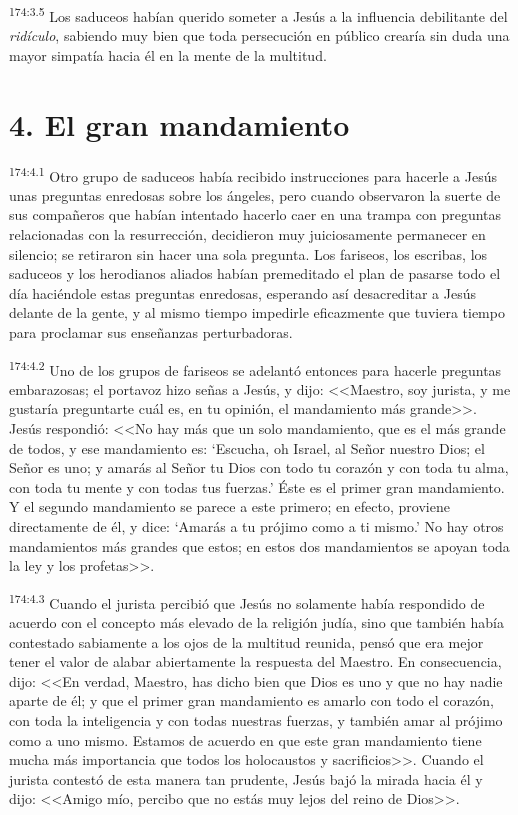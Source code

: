 \par 
\textsuperscript{174:3.5} Los saduceos habían querido someter a Jesús a la influencia debilitante del \textit{ridículo}, sabiendo muy bien que toda persecución en público crearía sin duda una mayor simpatía hacia él en la mente de la multitud.

\section*{4. El gran mandamiento}
\par 
\textsuperscript{174:4.1} Otro grupo de saduceos había recibido instrucciones para hacerle a Jesús unas preguntas enredosas sobre los ángeles, pero cuando observaron la suerte de sus compañeros que habían intentado hacerlo caer en una trampa con preguntas relacionadas con la resurrección, decidieron muy juiciosamente permanecer en silencio; se retiraron sin hacer una sola pregunta. Los fariseos, los escribas, los saduceos y los herodianos aliados habían premeditado el plan de pasarse todo el día haciéndole estas preguntas enredosas, esperando así desacreditar a Jesús delante de la gente, y al mismo tiempo impedirle eficazmente que tuviera tiempo para proclamar sus enseñanzas perturbadoras.

\par 
\textsuperscript{174:4.2} Uno de los grupos de fariseos se adelantó entonces para hacerle preguntas embarazosas; el portavoz hizo señas a Jesús, y dijo: <<Maestro, soy jurista, y me gustaría preguntarte cuál es, en tu opinión, el mandamiento más grande>>. Jesús respondió: <<No hay más que un solo mandamiento, que es el más grande de todos, y ese mandamiento es: `Escucha, oh Israel, al Señor nuestro Dios; el Señor es uno; y amarás al Señor tu Dios con todo tu corazón y con toda tu alma, con toda tu mente y con todas tus fuerzas.' Éste es el primer gran mandamiento. Y el segundo mandamiento se parece a este primero; en efecto, proviene directamente de él, y dice: `Amarás a tu prójimo como a ti mismo.' No hay otros mandamientos más grandes que estos; en estos dos mandamientos se apoyan toda la ley y los profetas>>.

\par 
\textsuperscript{174:4.3} Cuando el jurista percibió que Jesús no solamente había respondido de acuerdo con el concepto más elevado de la religión judía, sino que también había contestado sabiamente a los ojos de la multitud reunida, pensó que era mejor tener el valor de alabar abiertamente la respuesta del Maestro. En consecuencia, dijo: <<En verdad, Maestro, has dicho bien que Dios es uno y que no hay nadie aparte de él; y que el primer gran mandamiento es amarlo con todo el corazón, con toda la inteligencia y con todas nuestras fuerzas, y también amar al prójimo como a uno mismo. Estamos de acuerdo en que este gran mandamiento tiene mucha más importancia que todos los holocaustos y sacrificios>>. Cuando el jurista contestó de esta manera tan prudente, Jesús bajó la mirada hacia él y dijo: <<Amigo mío, percibo que no estás muy lejos del reino de Dios>>.

